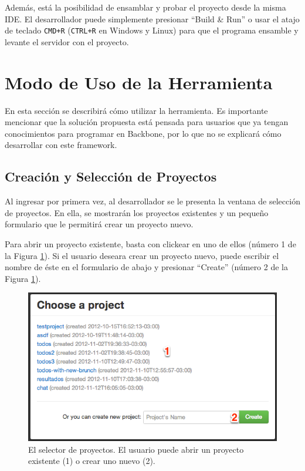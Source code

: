 \documentclass[12pt,spanish,letter]{report}
\makeatletter
\def\maxwidth{\ifdim\Gin@nat@width>\linewidth\linewidth
\else\Gin@nat@width\fi}
\let\Oldincludegraphics\includegraphics
\renewcommand{\includegraphics}[1]{\Oldincludegraphics[width=\maxwidth]{#1}}
\makeatother
\begin{document}
Además, está la posibilidad de ensamblar y probar el proyecto desde la
misma IDE. El desarrollador puede simplemente presionar ``Build \& Run''
o usar el atajo de teclado \texttt{CMD+R} (\texttt{CTRL+R} en Windows y
Linux) para que el programa ensamble y levante el servidor con el
proyecto.

\section{Modo de Uso de la Herramienta}

En esta sección se describirá cómo utilizar la herramienta. Es
importante mencionar que la solución propuesta está pensada para
usuarios que ya tengan conocimientos para programar en Backbone, por lo
que no se explicará cómo desarrollar con este framework.

\subsection{Creación y Selección de Proyectos}

Al ingresar por primera vez, al desarrollador se le presenta la ventana
de selección de proyectos. En ella, se mostrarán los proyectos
existentes y un pequeño formulario que le permitirá crear un proyecto
nuevo.

Para abrir un proyecto existente, basta con clickear en uno de ellos
(número 1 de la Figura \ref{figures:tutorial-projects}). Si el usuario
deseara crear un proyecto nuevo, puede escribir el nombre de éste en el
formulario de abajo y presionar ``Create'' (número 2 de la Figura
\ref{figures:tutorial-projects}).

\begin{figure}[htbp]
\centering
\includegraphics{figures/tutorial-projects.png}
\caption{El selector de proyectos. El usuario puede abrir un proyecto
existente (1) o crear uno nuevo (2). \label{figures:tutorial-projects}}
\end{figure}
\end{document}
